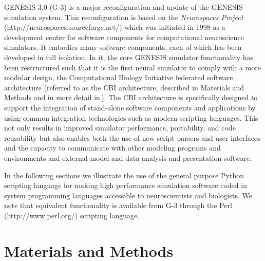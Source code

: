 \documentclass[10pt]{article}
\begin{document}
GENESIS 3.0 (G-3) is a major reconfiguration and update of the GENESIS
simulation system.  This reconfiguration is based on the {\it Neurospaces Project} (http://neurospaces.sourceforge.net/) which was initiated in 1998 as a development center for software components for computational neuroscience simulators. It embodies many software components, each of which has been developed in full isolation. In it, the core GENESIS simulator functionality has been
restructured such that it is the first neural simulator to comply with a more modular design, the Computational 
Biology Initiative federated software architecture (referred to as the CBI
 architecture, described in Materials and Methods and in more detail in\,\cite{cornelis11b}). The CBI
architecture is specifically designed to support
the integration of stand-alone software components and applications by
using common integration technologies such as modern scripting
languages. This not only results in
improved simulator performance, portability, and code reusability but also enables both the
use of new script parsers and user interfaces and the capacity
to communicate with other modeling programs and environments and external model and data analysis and presentation software.

In the following sections we illustrate the use of the general purpose Python scripting
language for making high performance simulation software coded in
system programming languages accessible to neuroscientists and
biologists. We note that equivalent functionality is available from G-3 through the Perl (http://www.perl.org/) scripting language. 

\section*{Materials and Methods}
\end{document}
